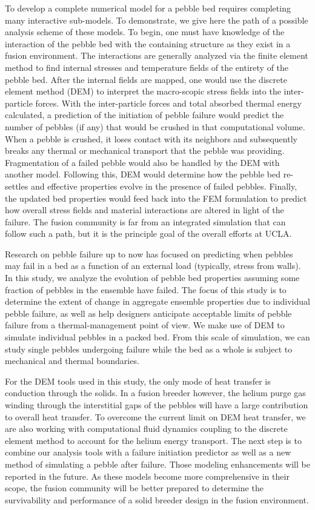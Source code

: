To develop a complete numerical model for a pebble bed requires completing many interactive sub-models. To demonstrate, we give here the path of a possible analysis scheme of these models. To begin, one must have knowledge of the interaction of the pebble bed with the containing structure as they exist in a fusion environment. The interactions are generally analyzed via the finite element method to find internal stresses and temperature fields of the entirety of the pebble bed. After the internal fields are mapped, one would use the discrete element method (DEM) to interpret the macro-scopic stress fields into the inter-particle forces. With the inter-particle forces and total absorbed thermal energy calculated, a prediction of the initiation of pebble failure would predict the number of pebbles (if any) that would be crushed in that computational volume. When a pebble is crushed, it loses contact with its neighbors and subsequently breaks any thermal or mechanical transport that the pebble was providing. Fragmentation of a failed pebble would also be handled by the DEM with another model. Following this, DEM would determine how the pebble bed re-settles and effective properties evolve in the presence of failed pebbles.  Finally, the updated bed properties would feed back into the FEM formulation to predict how overall stress fields and material interactions are altered in light of the failure. The fusion community is far from an integrated simulation that can follow such a path, but it is the principle goal of the overall efforts at UCLA.

Research on pebble failure up to now has focused on predicting when pebbles may fail in a bed as a function of an external load (typically, stress from walls). In this study, we analyze the evolution of pebble bed properties assuming some fraction of pebbles in the ensemble have failed. The focus of this study is to determine the extent of change in aggregate ensemble properties due to individual pebble failure, as well as help designers anticipate acceptable limits of pebble failure from a thermal-management point of view. We make use of DEM to simulate individual pebbles in a packed bed. From this scale of simulation, we can study single pebbles undergoing failure while the bed as a whole is subject to mechanical and thermal boundaries.

For the DEM tools used in this study, the only mode of heat transfer is conduction through the solids. In a fusion breeder however, the helium purge gas winding through the interstitial gaps of the pebbles will have a large contribution to overall heat transfer\cite{Reimann2002,Abou-Sena2005}. To overcome the current limit on DEM heat transfer, we are also working with computational fluid dynamics coupling to the discrete element method to account for the helium energy transport. The next step is to combine our analysis tools with a failure initiation predictor as well as a new method of simulating a pebble after failure. Those modeling enhancements will be reported in the future. As these models become more comprehensive in their scope, the fusion community will be better prepared to determine the survivability and performance of a solid breeder design in the fusion environment.


